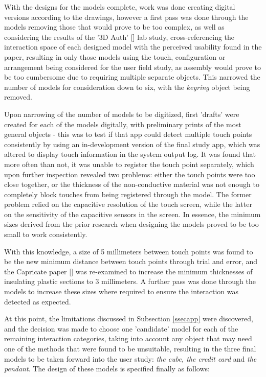 \documentclass{l4proj}
\begin{document}
With the designs for the models complete, work was done creating digital versions according to the drawings, however a first pass was done through the models removing those that would prove to be too complex, as well as considering the results of the '3D Auth' [\cite{marky20203d}] lab study, cross-referencing the interaction space of each designed model with the perceived usability found in the paper, resulting in only those models using the touch, configuration or arrangement being considered for the user field study, as assembly would prove to be too cumbersome due to requiring multiple separate objects. This narrowed the number of models for consideration down to six, with the \textit{keyring} object being removed.

Upon narrowing of the number of models to be digitized, first 'drafts' were created for each of the models digitally, with preliminary prints of the most general objects - this was to test if that app could detect multiple touch points consistently by using an in-development version of the final study app, which was altered to display touch information in the system output log. It was found that more often than not, it was unable to register the touch point separately, which upon further inspection revealed two problems: either the touch points were too close together, or the thickness of the non-conductive material was not enough to completely block touches from being registered through the model. The former problem relied on the capacitive resolution of the touch screen, while the latter on the sensitivity of the capacitive sensors in the screen. In essence, the minimum sizes derived from the prior research when designing the models proved to be too small to work consistently.

With this knowledge, a size of 5 millimeters between touch points was found to be the new minimum distance between touch points through trial and error, and the Capricate paper [\cite{schmitz2015capricate}] was re-examined to increase the minimum thicknesses of insulating plastic sections to 3 millimeters. A further pass was done through the models to increase these sizes where required to ensure the interaction was detected as expected.

At this point, the limitations discussed in Subsection \ref{ssecapp} were discovered, and the decision was made to choose one 'candidate' model for each of the remaining interaction categories, taking into account any object that may need one of the methods that were found to be unsuitable, resulting in the three final models to be taken forward into the user study: \textit{the cube, the credit card} and \textit{the pendant}. The design of these models is specified finally as follows:
\end{document}
